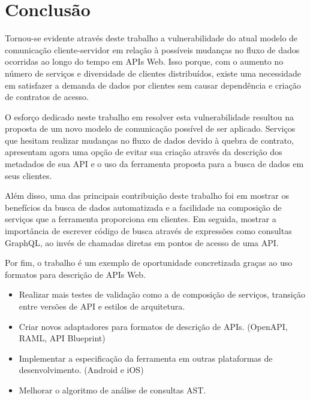 \chapter{Conclusão}

Tornou-se evidente através deste trabalho a vulnerabilidade do atual modelo de comunicação cliente-servidor em relação à possíveis mudanças no fluxo de dados ocorridas ao longo do tempo em APIs Web. Isso porque, com o aumento no número de serviços e diversidade de clientes distribuídos, existe uma necessidade em satisfazer a demanda de dados por clientes sem causar dependência e criação de contratos de acesso.

O esforço dedicado neste trabalho em resolver esta vulnerabilidade resultou na proposta de um novo modelo de comunicação possível de ser aplicado. Serviços que hesitam realizar mudanças no fluxo de dados devido à quebra de contrato, apresentam agora uma opção de evitar sua criação através da descrição dos metadados de sua API e o uso da ferramenta proposta para a busca de dados em seus clientes.

Além disso, uma das principais contribuição deste trabalho foi em mostrar os benefícios da busca de dados automatizada e a facilidade na composição de serviços que a ferramenta proporciona em clientes. Em seguida, mostrar a importância de escrever código de busca através de expressões como consultas GraphQL, ao invés de chamadas diretas em pontos de acesso de uma API.

Por fim, o trabalho é um exemplo de oportunidade concretizada graças ao uso formatos para descrição de APIs Web.



\begin{itemize}
\item Realizar mais testes de validação como a de composição de serviços, transição entre versões de API e estilos de arquitetura.
\item Criar novos adaptadores para formatos de descrição de APIs. (OpenAPI, RAML, API Blueprint)
\item Implementar a especificação da ferramenta em outras plataformas de desenvolvimento. (Android e iOS)
\item Melhorar o algoritmo de análise de consultas AST.
\end{itemize}
